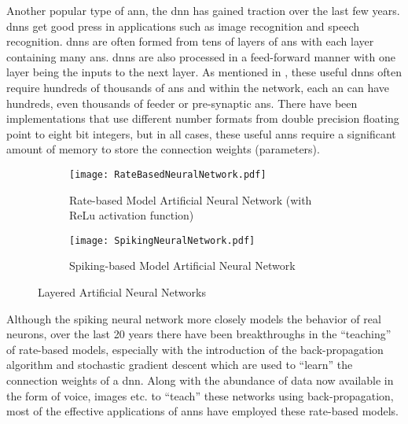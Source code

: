 Another popular type of \ac{ann}, the \ac{dnn} \cite{aizenberg2013multi}\cite{doi:10.1162/neco.2006.18.7.1527} has gained traction over the last few years. \acp{dnn} get good press in applications such as image recognition and speech recognition. 
\acp{dnn} are often formed from tens of layers of \ac{an}s with each layer containing many \ac{an}s. \ac{dnn}s are also processed in a feed-forward manner with one layer being the inputs to the next layer. 
As mentioned in \cite{krizhevsky2012imagenet}, these useful \ac{dnn}s often require hundreds of thousands of \ac{an}s and within the network, each \ac{an} can have hundreds, even thousands of feeder or pre-synaptic \ac{an}s.
There have been implementations that use different number formats from double precision floating point to eight bit integers, but in all cases, these useful \ac{ann}s require a significant amount of memory to store the connection weights (parameters).


\begin{figure}[!t]
  \centering
  \captionsetup{justification=centering}
  \captionsetup{width=.9\linewidth}
  \begin{subfigure}{.9\textwidth}
    \centerline{
    \mbox{\texttt{[image: RateBasedNeuralNetwork.pdf]}}
    }
    \caption{Rate-based Model Artificial Neural Network (with ReLu activation function)}
    \label{fig:Rate-based Model Network}
  \end{subfigure}
  
  \begin{subfigure}{.9\textwidth}
    \centerline{
    \mbox{\texttt{[image: SpikingNeuralNetwork.pdf]}}
    }
    \caption{Spiking-based Model Artificial Neural Network}
    \label{fig:Spiking Model Network}
  \end{subfigure}
  \caption{Layered Artificial Neural Networks}
  \label{fig:Layered Artificial Neural Networks}
\end{figure}

Although the spiking neural network more closely models the behavior of real neurons, over the last 20 years there 
have been breakthroughs in the ``teaching'' of rate-based models, especially with the introduction of the back-propagation algorithm \cite{wikipedia_back_propagation} and stochastic gradient descent \cite{wikipedia_sgd} which are used to ``learn'' the connection weights of a \ac{dnn}. 
Along with the abundance of data now available in the form of voice, images etc. to ``teach'' these networks using back-propagation, most of the effective applications of \acp{ann} have employed these rate-based models.

